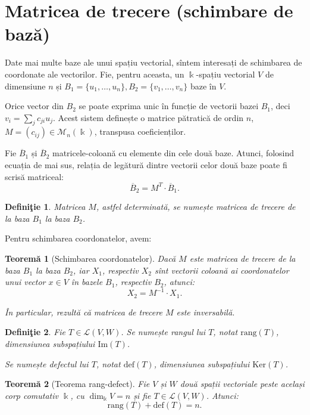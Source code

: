 \documentclass[11pt,a4paper]{article}
\newcommand\kal{\mathcal}
\theoremstyle{dotless}
\newtheorem{theorem}{Teorem\u{a}}[section]
\theoremstyle{dotlessdr}
\newtheorem{definition}{Defini\c{t}ie}[section]
\begin{document}

\section{Matricea de trecere (schimbare de bază)}
\label{sec:matrice-trecere}

Date mai multe baze ale unui spațiu vectorial, sîntem interesați de schimbarea
de coordonate ale vectorilor. Fie, pentru aceasta, un $\Bbbk$-spațiu vectorial 
$V$ de dimensiune $n$ și $B_1 = \{u_1, \dots, u_n\}, B_2 = \{v_1,\dots,v_n\}$ 
baze în $V$.

Orice vector din $B_2$ se poate exprima unic în funcție de vectorii bazei $B_1$, 
deci $v_i = \sum_j c_{ji} u_j$. Acest sistem definește o matrice pătratică de 
ordin $n$, $M = (c_{ij}) \in \mathcal{M}_n(\Bbbk)$, transpusa coeficienților.

Fie $\overline{B}_1$ și $\overline{B}_2$ matricele-coloană cu elemente din cele 
două baze. Atunci, folosind ecuația de mai sus, relația de legătură dintre 
vectorii celor două baze poate fi scrisă matriceal: 
\[
\overline{B}_2 = M^T \cdot \overline{B}_1.
\]

\begin{definition}
Matricea $M$, astfel determinată, se numește \emph{matricea de trecere} de la 
baza $B_1$ la baza $B_2$.
\end{definition}

Pentru schimbarea coordonatelor, avem:
\begin{theorem}[Schimbarea coordonatelor]
Dacă $M$ este matricea de trecere de la baza $B_1$ la baza $B_2$, iar $X_1$, 
respectiv $X_2$ sînt vectorii coloană ai coordonatelor unui vector $x \in V$ în 
bazele $B_1$, respectiv $B_2$, atunci: 
\[
X_2 = M^{-1} \cdot X_1.
\]

În particular, rezultă că matricea de trecere $M$ este inversabilă.
\end{theorem}

\begin{definition}\label{def:rang-defect}
  Fie $T \in \kal{L}(V, W)$. Se numește \emph{rangul} lui $T$, notat $\mathrm{rang}(T)$,
  dimensiunea subspațiului $\mathrm{Im}(T)$.

  Se numește \emph{defectul} lui $T$, notat $\mathrm{def}(T)$, dimensiunea subspațiului
  $\mathrm{Ker}(T)$.
\end{definition}

\begin{theorem}[Teorema rang-defect]\label{thm:rang-defect}
  Fie $V$ și $W$ două spații vectoriale peste același corp comutativ $\Bbbk$,
  cu $\dim_\Bbbk V = n$ și fie $T \in \kal{L}(V, W)$. Atunci:
  \[
    \mathrm{rang}(T) + \mathrm{def}(T) = n.
  \]
\end{theorem}
\end{document}
